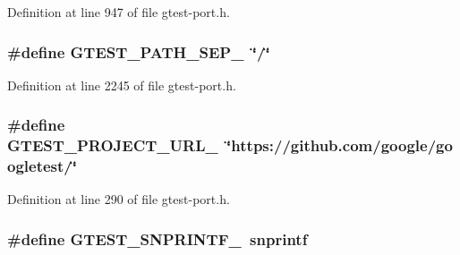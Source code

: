 Definition at line 947 of file gtest-\/port.\+h.

\subsubsection[{\texorpdfstring{G\+T\+E\+S\+T\+\_\+\+P\+A\+T\+H\+\_\+\+S\+E\+P\+\_\+}{GTEST_PATH_SEP_}}]{\setlength{\rightskip}{0pt plus 5cm}\#define G\+T\+E\+S\+T\+\_\+\+P\+A\+T\+H\+\_\+\+S\+E\+P\+\_\+~\char`\"{}/\char`\"{}}\hypertarget{gtest-port_8h_afbb636e91bdd50267dbef11a50490b29}{}\label{gtest-port_8h_afbb636e91bdd50267dbef11a50490b29}


Definition at line 2245 of file gtest-\/port.\+h.

\subsubsection[{\texorpdfstring{G\+T\+E\+S\+T\+\_\+\+P\+R\+O\+J\+E\+C\+T\+\_\+\+U\+R\+L\+\_\+}{GTEST_PROJECT_URL_}}]{\setlength{\rightskip}{0pt plus 5cm}\#define G\+T\+E\+S\+T\+\_\+\+P\+R\+O\+J\+E\+C\+T\+\_\+\+U\+R\+L\+\_\+~\char`\"{}https\+://github.\+com/google/googletest/\char`\"{}}\hypertarget{gtest-port_8h_a5aa3c938fc1d049f1d9c5332f6a0b1d4}{}\label{gtest-port_8h_a5aa3c938fc1d049f1d9c5332f6a0b1d4}


Definition at line 290 of file gtest-\/port.\+h.

\subsubsection[{\texorpdfstring{G\+T\+E\+S\+T\+\_\+\+S\+N\+P\+R\+I\+N\+T\+F\+\_\+}{GTEST_SNPRINTF_}}]{\setlength{\rightskip}{0pt plus 5cm}\#define G\+T\+E\+S\+T\+\_\+\+S\+N\+P\+R\+I\+N\+T\+F\+\_\+~snprintf}\hypertarget{gtest-port_8h_aed1cc8143222d7a845a1269448ec203e}{}\label{gtest-port_8h_aed1cc8143222d7a845a1269448ec203e}


